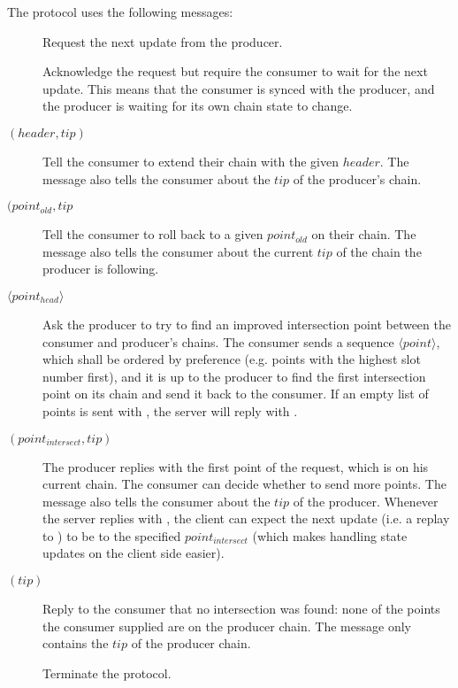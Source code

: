 The protocol uses the following messages:
\begin{description}
\item [\MsgRequestNext]
      Request the next update from the producer.
\item [\MsgAwaitReply]
      Acknowledge the request but require the consumer to wait for the next update.
      This means that the consumer is synced with the producer, and
      the producer is waiting for its own chain state to change.
\item [\MsgRollForward{} {\boldmath $(header, tip)$}]
      Tell the consumer to extend their chain with the given $header$.
      The message also tells the consumer about the $tip$ of the producer's chain.
\item [\MsgRollBackward{} {\boldmath $(point_{old}, tip$}]
      Tell the consumer to roll back to a given $point_{old}$ on their chain.
      The message also tells the consumer about the current  $tip$ of the chain the producer is following.
\item [\MsgFindIntersect{} {\boldmath $\langle point_{head} \rangle $}]
      Ask the producer to try to find an improved intersection point between
      the consumer and producer's chains.
      The consumer sends a sequence {\boldmath $\langle point \rangle $}, which
      shall be ordered by preference (e.g. points with the highest slot number
      first), and it is up to the producer to find the first intersection point
      on its chain and send it back to the consumer.  If an empty list of
      points is sent with \MsgFindIntersect{}, the server will reply with
      \MsgIntersectNotFound{}.
\item [\MsgIntersectFound{} {\boldmath $(point_{intersect} ,tip)$}]
      The producer replies with the first point of the request, which is on his current chain.
      The consumer can decide whether to send more points.
      The message also tells the consumer about the $tip$ of the producer.
      Whenever the server replies with \MsgIntersectFound{}, the client can
      expect the next update (i.e. a replay to \MsgRequestNext{}) to be
      \MsgRollBackward{} to the specified $point_{intersect}$ (which makes
      handling state updates on the client side easier).
\item [\MsgIntersectNotFound{} {\boldmath $(tip)$}]
      Reply to the consumer that no intersection was found: none of the
      points the consumer supplied are on the producer chain.
      The message only contains the $tip$ of the producer chain.
\item [\MsgDone]
      Terminate the protocol.
\end{description}

